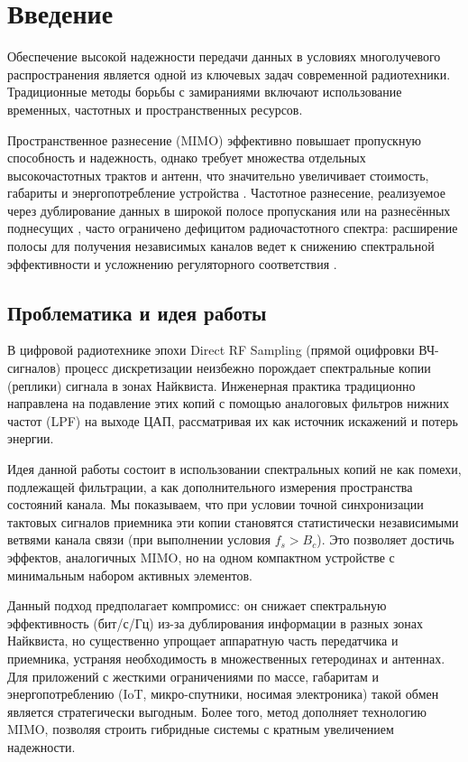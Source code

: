 \documentclass[a4paper,12pt]{article}
\numberwithin{equation}{section}
\begin{document}
\section{Введение}

Обеспечение высокой надежности передачи данных в условиях многолучевого распространения является одной из ключевых задач современной радиотехники. Традиционные методы борьбы с замираниями включают использование временных, частотных и пространственных ресурсов. 

Пространственное разнесение (MIMO) эффективно повышает пропускную способность и надежность, однако требует множества отдельных высокочастотных трактов и антенн, что значительно увеличивает стоимость, габариты и энергопотребление устройства \cite{proakis,goldsmith}. Частотное разнесение, реализуемое через дублирование данных в широкой полосе пропускания или на разнесённых поднесущих \cite{abdelgader}, часто ограничено дефицитом радиочастотного спектра: расширение полосы для получения независимых каналов ведет к снижению спектральной эффективности и усложнению регуляторного соответствия \cite{goldsmith}.

\subsection{Проблематика и идея работы}
В цифровой радиотехнике эпохи Direct RF Sampling (прямой оцифровки ВЧ-сигналов) процесс дискретизации неизбежно порождает спектральные копии (реплики) сигнала в зонах Найквиста. Инженерная практика традиционно направлена на подавление этих копий с помощью аналоговых фильтров нижних частот (LPF) на выходе ЦАП, рассматривая их как источник искажений и потерь энергии.

Идея данной работы состоит в использовании спектральных копий не как помехи, подлежащей фильтрации, а как дополнительного измерения пространства состояний канала. Мы показываем, что при условии точной синхронизации тактовых сигналов приемника эти копии становятся статистически независимыми ветвями канала связи (при выполнении условия $f_s > B_c$). Это позволяет достичь эффектов, аналогичных MIMO, но на одном компактном устройстве с минимальным набором активных элементов.

Данный подход предполагает компромисс: он снижает спектральную эффективность (бит/с/Гц) из-за дублирования информации в разных зонах Найквиста, но существенно упрощает аппаратную часть передатчика и приемника, устраняя необходимость в множественных гетеродинах и антеннах. Для приложений с жесткими ограничениями по массе, габаритам и энергопотреблению (IoT, микро-спутники, носимая электроника) такой обмен является стратегически выгодным. Более того, метод дополняет технологию MIMO, позволяя строить гибридные системы с кратным увеличением надежности.
\end{document}
